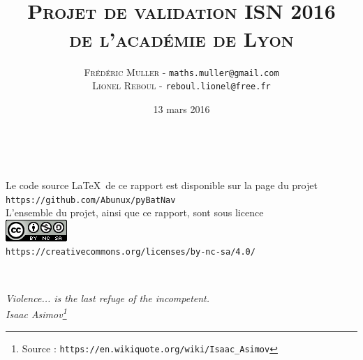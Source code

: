 \title{\\ \medskip \medskip\medskip\medskip \large{\textsc{Projet de validation ISN 2016\\de l'académie de Lyon}}\vfill}

\author{\textsc{Frédéric Muller} - \texttt{maths.muller@gmail.com}\\ \bigskip \textsc{Lionel Reboul} - \texttt{reboul.lionel@free.fr}}

\date{\vfill 13 mars 2016} 

\pagestyle{empty}

\maketitle

\newpage
\ \\
\vfill

\begin{center}
Le code source \LaTeX\ de ce rapport est disponible sur la page du projet\\ \medskip
\texttt{https://github.com/Abunux/pyBatNav}\\ 
\vfill
L'ensemble du projet, ainsi que ce rapport, sont sous licence\\ \medskip
\includegraphics[scale=1]{./media/CC-Logo.png}\\
\texttt{https://creativecommons.org/licenses/by-nc-sa/4.0/}
\end{center}

\newpage
\ \\
\vspace{3cm}
\begin{flushright}


\textit{Violence... is the last refuge of the incompetent.\\
\medskip
Isaac Asimov\footnote{Source : \texttt{https://en.wikiquote.org/wiki/Isaac\_Asimov}}}

\end{flushright}
\vfill

\clearpage{\pagestyle{empty}\cleardoublepage}
\setcounter{tocdepth}{1}
\tableofcontents